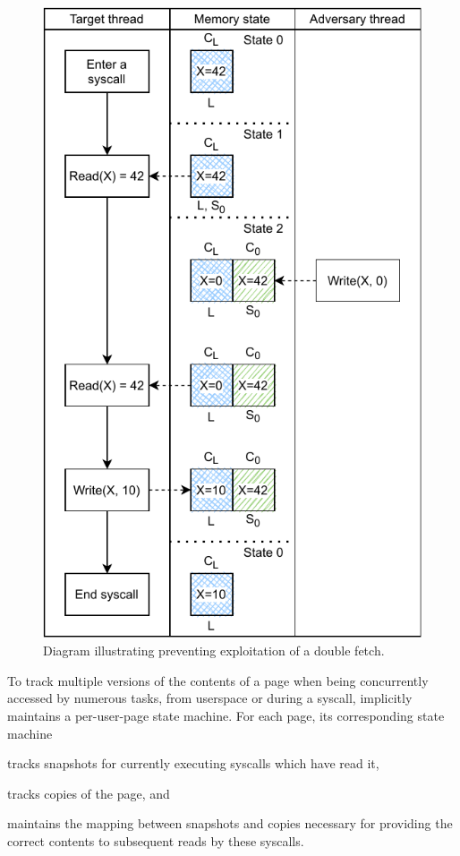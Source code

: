\documentclass[letterpaper,twocolumn,10pt, anonymous]{article}
\begin{document}
\begin{figure}[]
  \includegraphics[width=\linewidth]{img/doublefetch_tiktok.pdf}
  \caption{Diagram illustrating \tiktok preventing exploitation of a double fetch.}
  \label{fig:doublefetch_tiktok}
\end{figure}

To track multiple versions of the contents of a page when being concurrently 
accessed by numerous tasks, from userspace or during a syscall,
\tiktok implicitly maintains a per-user-page state machine.
For each page, its corresponding state machine 
\begin{inparaenum}
  \item tracks snapshots for currently executing syscalls which have read it, 
  \item tracks copies of the page, and 
  \item maintains the mapping between snapshots and copies necessary for providing 
  the correct contents to subsequent reads by these syscalls.
\end{inparaenum}
\end{document}
